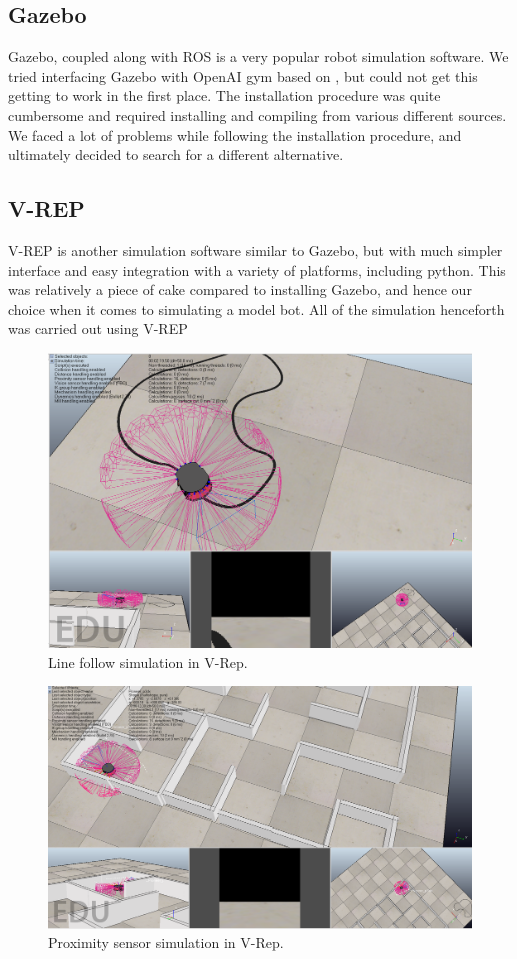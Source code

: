 \documentclass[12pt]{extreport}
\theoremstyle{plain}
\theoremstyle{definition}
\begin{document}
\subsection{Gazebo}
Gazebo, \cite{gazebo} coupled along with ROS \cite{ros} is a very popular robot simulation software. We tried interfacing Gazebo with OpenAI gym based on \cite{gym-gazebo}, but could not get this getting to work in the first place. The installation procedure was quite cumbersome and required installing and compiling from various different sources. We faced a lot of problems while following the installation procedure, and ultimately decided to search for a different alternative.

\subsection{V-REP}
V-REP \cite{v-rep} is another simulation software similar to Gazebo, but with much simpler interface and easy integration with a variety of platforms, including python. This was relatively a piece of cake compared to installing Gazebo, and hence our choice when it comes to simulating a model bot. All of the simulation henceforth was carried out using V-REP

\begin{figure}[h]
    \centering
    \includegraphics[width=0.8\linewidth]{2.png}
    \caption{Line follow simulation in V-Rep.}
\end{figure}

\begin{figure}[h]
    \centering
    \includegraphics[width=0.8\linewidth]{3.png}
    \caption{Proximity sensor simulation in V-Rep.}
\end{figure}
\end{document}
